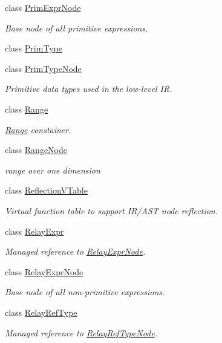 \begin{DoxyCompactItemize}
class \hyperlink{classtvm_1_1PrimExprNode}{Prim\+Expr\+Node}
\begin{DoxyCompactList}\small\item\em Base node of all primitive expressions. \end{DoxyCompactList}\item 
class \hyperlink{classtvm_1_1PrimType}{Prim\+Type}
\item 
class \hyperlink{classtvm_1_1PrimTypeNode}{Prim\+Type\+Node}
\begin{DoxyCompactList}\small\item\em Primitive data types used in the low-\/level IR. \end{DoxyCompactList}\item 
class \hyperlink{classtvm_1_1Range}{Range}
\begin{DoxyCompactList}\small\item\em \hyperlink{classtvm_1_1Range}{Range} constainer. \end{DoxyCompactList}\item 
class \hyperlink{classtvm_1_1RangeNode}{Range\+Node}
\begin{DoxyCompactList}\small\item\em range over one dimension \end{DoxyCompactList}\item 
class \hyperlink{classtvm_1_1ReflectionVTable}{Reflection\+V\+Table}
\begin{DoxyCompactList}\small\item\em Virtual function table to support I\+R/\+A\+ST node reflection. \end{DoxyCompactList}\item 
class \hyperlink{classtvm_1_1RelayExpr}{Relay\+Expr}
\begin{DoxyCompactList}\small\item\em Managed reference to \hyperlink{classtvm_1_1RelayExprNode}{Relay\+Expr\+Node}. \end{DoxyCompactList}\item 
class \hyperlink{classtvm_1_1RelayExprNode}{Relay\+Expr\+Node}
\begin{DoxyCompactList}\small\item\em Base node of all non-\/primitive expressions. \end{DoxyCompactList}\item 
class \hyperlink{classtvm_1_1RelayRefType}{Relay\+Ref\+Type}
\begin{DoxyCompactList}\small\item\em Managed reference to \hyperlink{classtvm_1_1RelayRefTypeNode}{Relay\+Ref\+Type\+Node}. \end{DoxyCompactList}\item 

\end{DoxyCompactItemize}
